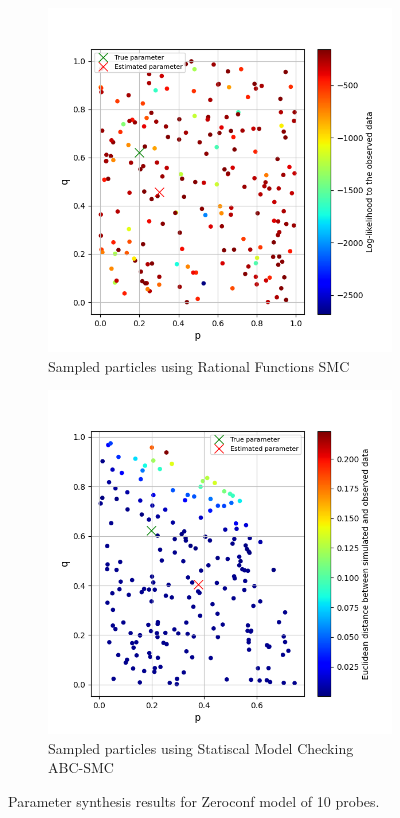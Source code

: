 \begin{figure}[H]
    \centering
    \begin{subfigure}{0.48\textwidth}
        \centering
        \includegraphics[width=\linewidth]{figures/zeroconf10_rf.png}
        \caption{Sampled particles using Rational Functions SMC}
    \end{subfigure}
    \hfill
    \begin{subfigure}{0.48\textwidth}
        \centering
        \includegraphics[width=\linewidth]{figures/zeroconf10_sim.png}
        \caption{Sampled particles using Statiscal Model Checking ABC-SMC}
    \end{subfigure}
    \caption{Parameter synthesis results for Zeroconf model of 10 probes.}
\end{figure}


